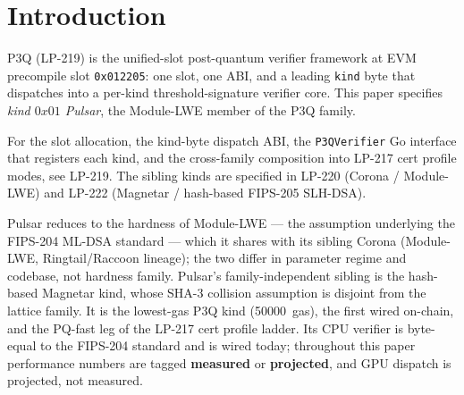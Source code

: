 \section{Introduction}

P3Q (LP-219) is the unified-slot post-quantum verifier framework at
EVM precompile slot \texttt{0x012205}: one slot, one ABI, and a
leading \texttt{kind} byte that dispatches into a per-kind
threshold-signature verifier core. This paper specifies
\emph{kind $0x01$ Pulsar}, the Module-LWE member of the P3Q family.

For the slot allocation, the kind-byte dispatch ABI, the
\texttt{P3QVerifier} Go interface that registers each kind, and the
cross-family composition into LP-217 cert profile modes, see LP-219.
The sibling kinds are specified in LP-220 (Corona / Module-LWE) and
LP-222 (Magnetar / hash-based FIPS-205 SLH-DSA).

Pulsar reduces to the hardness of Module-LWE --- the
assumption underlying the FIPS-204 ML-DSA standard --- which it
shares with its sibling Corona (Module-LWE, Ringtail/Raccoon
lineage); the two differ in parameter regime and codebase,
not hardness family. Pulsar's family-independent sibling is the
hash-based Magnetar kind, whose SHA-3 collision assumption is
disjoint from the lattice family. It is the lowest-gas P3Q kind
(\SI{50000}{gas}), the first wired on-chain, and the PQ-fast leg of
the LP-217 cert profile ladder. Its CPU verifier is byte-equal to
the FIPS-204 standard and is wired today; throughout this paper
performance numbers are tagged \textbf{measured} or
\textbf{projected}, and GPU dispatch is projected, not measured.
